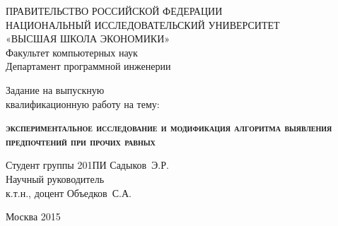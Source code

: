 \begin{titlepage}
	\newpage
	
	\begin{center}
		ПРАВИТЕЛЬСТВО РОССИЙСКОЙ ФЕДЕРАЦИИ \\
		НАЦИОНАЛЬНЫЙ ИССЛЕДОВАТЕЛЬСКИЙ УНИВЕРСИТЕТ \\
		«ВЫСШАЯ ШКОЛА ЭКОНОМИКИ» \\
		{\small Факультет компьютерных наук \\ 
			Департамент программной инженерии} \\ 
	\end{center}
	
	
	\vspace{8em}
	
	\begin{center}
		\Large Задание на выпускную \\ квалификационную работу на тему:
	\end{center}
	
	\vspace{2.5em}
	
	\begin{center}
		\textsc{\textbf{экспериментальное исследование и модификация \linebreak 
				алгоритма выявления предпочтений при прочих равных  }}
	\end{center}
	
	\vspace{18em}
	
	\begin{flushleft}
		Студент группы 201ПИ \hrulefill Садыков~Э.Р. \\
		\vspace{1.5em}
		Научный руководитель \\
		к.т.н., доцент \hrulefill Объедков~С.А.
	\end{flushleft}
	
	\vspace{\fill}
	
	\begin{center}
		Москва 2015
	\end{center}
	
\end{titlepage}